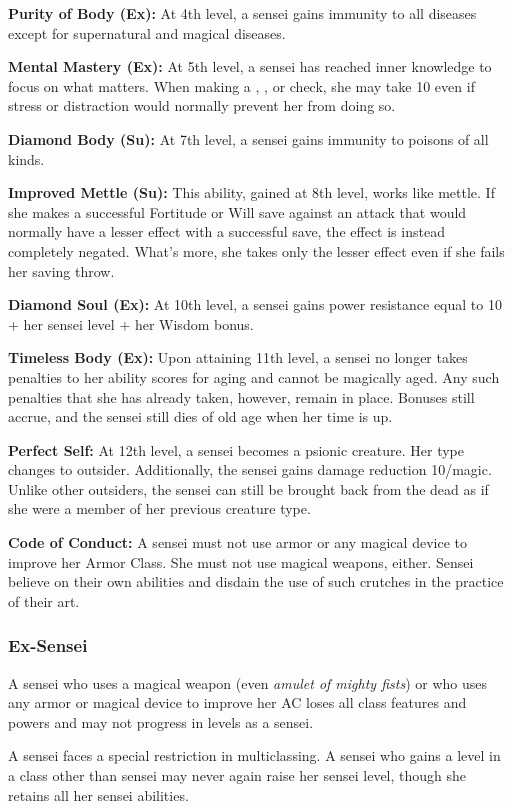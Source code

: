 {\textbf{Purity of Body (Ex):} At 4th level, a sensei gains immunity to all diseases except for supernatural and magical diseases.

\textbf{Mental Mastery (Ex):} At 5th level, a sensei has reached inner knowledge to focus on what matters. When making a , , or  check, she may take 10 even if stress or distraction would normally prevent her from doing so.

\textbf{Diamond Body (Su):} At 7th level, a sensei gains immunity to poisons of all kinds.

\textbf{Improved Mettle (Su):} This ability, gained at 8th level, works like mettle. If she makes a successful Fortitude or Will save against an attack that would normally have a lesser effect with a successful save, the effect is instead completely negated. What's more, she takes only the lesser effect even if she fails her saving throw.

\textbf{Diamond Soul (Ex):} At 10th level, a sensei gains power resistance equal to 10 + her sensei level + her Wisdom bonus.

\textbf{Timeless Body (Ex):} Upon attaining 11th level, a sensei no longer takes penalties to her ability scores for aging and cannot be magically aged. Any such penalties that she has already taken, however, remain in place. Bonuses still accrue, and the sensei still dies of old age when her time is up.

\textbf{Perfect Self:} At 12th level, a sensei becomes a psionic creature. Her type changes to outsider. Additionally, the sensei gains damage reduction 10/magic. Unlike other outsiders, the sensei can still be brought back from the dead as if she were a member of her previous creature type.

\textbf{Code of Conduct:} A sensei must not use armor or any magical device to improve her Armor Class. She must not use magical weapons, either. Sensei believe on their own abilities and disdain the use of such crutches in the practice of their art.

\subsubsection{Ex-Sensei}
A sensei who uses a magical weapon (even \emph{amulet of mighty fists}) or who uses any armor or magical device to improve her AC loses all class features and powers and may not progress in levels as a sensei. %

A sensei faces a special restriction in multiclassing. A sensei who gains a level in a class other than sensei may never again raise her sensei level, though she retains all her sensei abilities.
}
